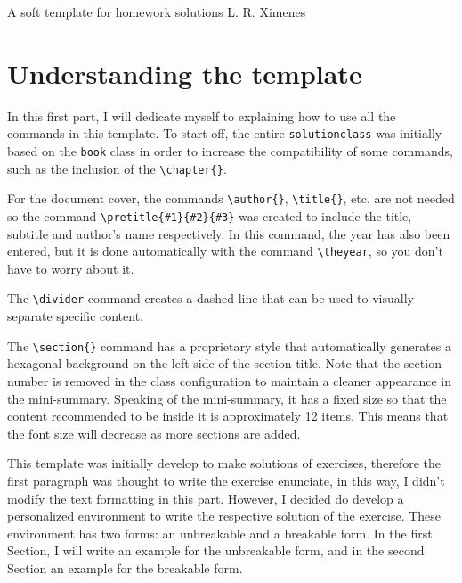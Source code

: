 \documentclass{solutionclass} %
\begin{document}
\pretitle
{A soft template}               %
{for homework solutions}        %
{L. R. Ximenes}                 %

\def\homeworkNumber{\#}

\makeatletter
    \startcontents[sections]
    \chapter{Understanding the template}
\makeatother

    In this first part, I will dedicate myself to explaining how to use all the commands in this template. To start off, the entire \verb|solutionclass| was initially based on the \verb|book| class in order to increase the compatibility of some commands, such as the inclusion of the \verb|\chapter{}|. 

    \divider

    For the document cover, the commands \verb|\author{}|, \verb|\title{}|, etc. are not needed so the command \verb|\pretitle{#1}{#2}{#3}| was created to include the title, subtitle and author's name respectively. In this command, the year has also been entered, but it is done automatically with the command \verb|\theyear|, so you don't have to worry about it.

    \divider

    The \verb|\divider| command creates a dashed line that can be used to visually separate specific content.

    \divider

    The \verb|\section{}| command has a proprietary style that automatically generates a hexagonal background on the left side of the section title. Note that the section number is removed in the class configuration to maintain a cleaner appearance in the mini-summary. Speaking of the mini-summary, it has a fixed size so that the content recommended to be inside it is approximately 12 items. This means that the font size will decrease as more sections are added.

    \divider

    This template was initially develop to make solutions of exercises, therefore the first paragraph was thought to write the exercise enunciate, in this way, I didn't modify the text formatting in this part. However, I decided do develop a personalized environment to write the respective solution of the exercise. These environment has two forms: an unbreakable and a breakable form. In the first Section, I will write an example for the unbreakable form, and in the second Section an example for the breakable form.
\end{document}
